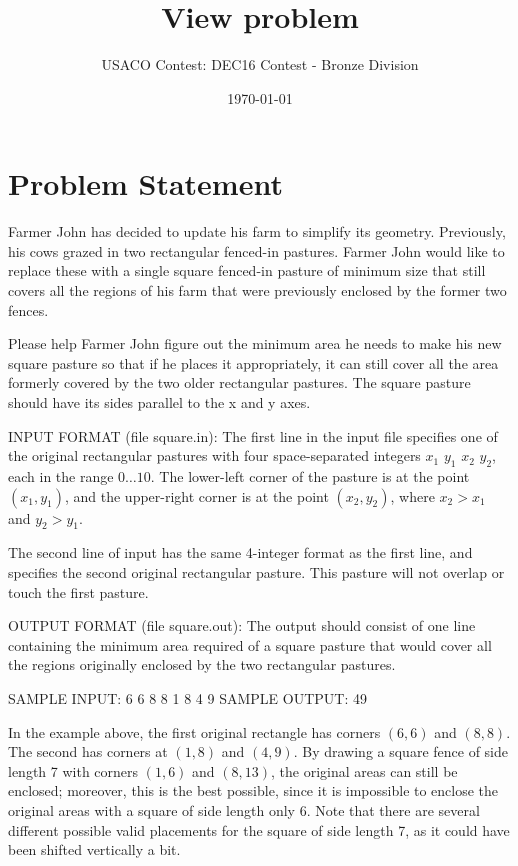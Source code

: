 \documentclass[12pt]{article}
\title{View problem}
\author{USACO Contest: DEC16 Contest - Bronze Division}
\date{\today}
\begin{document}
\maketitle

\section*{Problem Statement}

Farmer John has decided to update his farm to simplify its geometry. 
Previously, his cows grazed in two rectangular fenced-in pastures.  Farmer John
would like to replace these with a single square fenced-in pasture of minimum
size that still covers all the regions of his farm that were previously enclosed
by the former two fences.

Please help Farmer John figure out the minimum area he needs to make his new
square pasture so that if he places it appropriately, it can still cover all the
area formerly covered by the two older rectangular pastures.  The square
pasture should have its sides parallel to the x and y axes.

INPUT FORMAT (file square.in):
The first line in the input file specifies one of the original rectangular
pastures with four space-separated integers $x_1$ $y_1$ $x_2$ $y_2$,  each in
the range $0 \ldots 10$.  The lower-left corner of the pasture is at the point
$(x_1, y_1)$, and the upper-right corner is at the point $(x_2, y_2)$, where 
$x_2 > x_1$ and $y_2 > y_1$.

The second line of input has the same 4-integer format as the first line, and
specifies the second original rectangular pasture.  This pasture will not
overlap or touch the first pasture.

OUTPUT FORMAT (file square.out):
The output should consist of one line containing the minimum area required of a
square pasture that would cover all the regions originally enclosed by the two
rectangular pastures.  

SAMPLE INPUT:
6 6 8 8
1 8 4 9
SAMPLE OUTPUT: 
49

In the example above, the first original rectangle has corners $(6,6)$ and
$(8,8)$. The second has corners at $(1,8)$ and $(4,9)$.  By drawing a square fence
of side length 7 with corners $(1,6)$ and $(8,13)$, the original areas can still be enclosed; moreover, this is the best possible, since it is impossible to enclose the original areas with a square of side length only 6.  Note that there are several different possible valid placements for the square of side length 7, as it could have been shifted vertically a bit.
\end{document}
